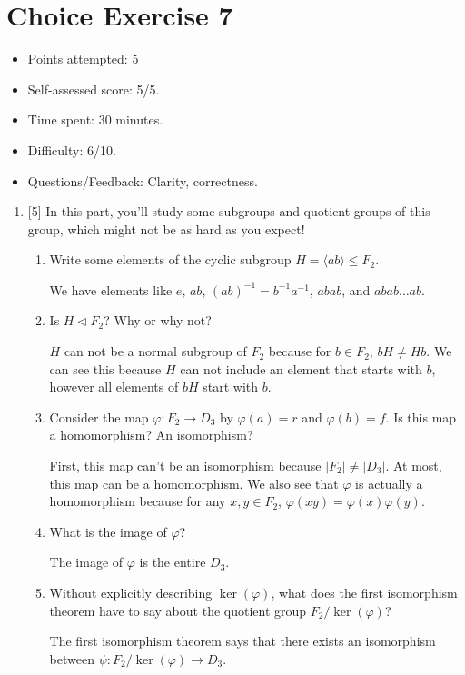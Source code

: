 \documentclass{article}
\newcommand{\inv}{^{-1}}
\begin{document}
\section*{Choice Exercise 7}
\begin{itemize}
  \item Points attempted: 5
  \item Self-assessed score: 5/5.
  \item Time spent: 30 minutes.
  \item Difficulty: 6/10.
  \item Questions/Feedback: Clarity, correctness.
\end{itemize}
\begin{enumerate}
    \item[2.] {
        [5] In this part, you'll study some subgroups and quotient groups of this group, which might not be as hard as you expect!
    
        \begin{enumerate}
            \item {
                Write some elements of the cyclic subgroup \(H = \langle ab \rangle \leq F_2\).
      
                We have elements like \(e\), \(ab\), \((ab)\inv = b\inv a\inv\),
                \(abab\), and \(abab \dots ab\).
            }

            \item {
                Is \(H \triangleleft F_2\)? Why or why not?
      
                \(H\) can not be a normal subgroup of \(F_2\) because for \(b \in F_2\),
                \(bH \not= Hb\). We can see this because \(H\) can not include 
                an element that starts with \(b\), however all elements of \(bH\)
                start with \(b\).
            }

            \item {
                Consider the map \(\varphi \colon F_2 \to D_3\) by \(\varphi(a) = r\) and \(\varphi(b) = f\). Is this map a homomorphism? An isomorphism?
      
                First, this map can't be an isomorphism because \(|F_2| \not= |D_3|\).
                At most, this map can be a homomorphism. We also see that 
                \(\varphi\) is actually a homomorphism because for any \(x, y \in F_2\),
                \(\varphi(xy) = \varphi(x) \varphi(y)\).
            }

            \item {
                What is the image of \(\varphi\)?
      
                The image of \(\varphi\) is the entire \(D_3\).
            }

            \item {
                Without explicitly describing \(\ker(\varphi)\), what does the 
                first isomorphism theorem have to say about the quotient group \(F_2/\ker(\varphi)\)?

                The first isomorphism theorem says that there exists an 
                isomorphism between \(\psi \colon F_2/\ker(\varphi) \to D_3\).
            }
        \end{enumerate}
    }
\end{enumerate}
\end{document}
